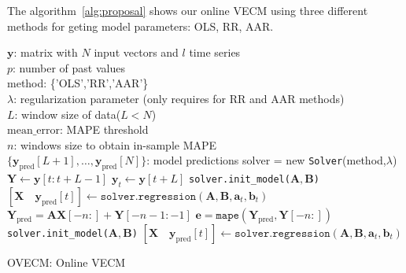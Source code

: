 The algorithm~\ref{alg:proposal} shows our online VECM using three different
methods for geting model parameters: OLS, RR, AAR.

\begin{algorithm}[ht]
\begin{algorithmic}[1]
\REQUIRE $\,$ \\
$\mathbf{y}$: matrix with $N$ input vectors and $l$ time series\\
$p$: number of past values \\
method: \{'OLS','RR','AAR'\} \\
$\lambda$: regularization parameter (only requires for RR and AAR methods) \\
$L$: window size of data($L<N$) \\
$\text{mean\_error}$: MAPE threshold \\
$n$: windows size to obtain in-sample MAPE \\
\ENSURE  $\,$ \\
$\{\mathbf{y}_{\text{pred}}[L+1],\dots, \mathbf{y}_{\text{pred}}[N]\}$: model predictions 
\STATE solver = new \texttt{Solver}(method,$\lambda$) \\
    \STATE $\mathbf{Y} \gets \mathbf{y}[t:t+L-1]$
    \STATE $\mathbf{y}_t \gets \mathbf{y}[t+L]$
        \STATE \texttt{solver.init\_model($\mathbf{A},\mathbf{B}$)} 
    \ENDIF
    \STATE $[\mathbf{X} \quad \mathbf{y}_{\text{pred}}[t]] \gets \texttt{solver.regression}
    (\mathbf{A},\mathbf{B},\mathbf{a}_t,\mathbf{b}_t)$
    \STATE $\mathbf{Y}_{\text{pred}} = \mathbf{AX}[-n:]+\mathbf{Y}[-n-1:-1]$
    \STATE $\mathbf{e} = \texttt{mape}(\mathbf{Y}_{\text{pred}},\mathbf{Y}[-n:])$
        \STATE \texttt{solver.init\_model($\mathbf{A},\mathbf{B}$)} 
        \STATE $[\mathbf{X} \quad \mathbf{y}_{\text{pred}}[t]] \gets \texttt{solver.regression}
        (\mathbf{A},\mathbf{B},\mathbf{a}_t,\mathbf{b}_t)$
    \ENDIF
{}
\ENDFOR
\end{algorithmic}
\caption{OVECM: Online VECM}
\label{alg:proposal}
\end{algorithm}


